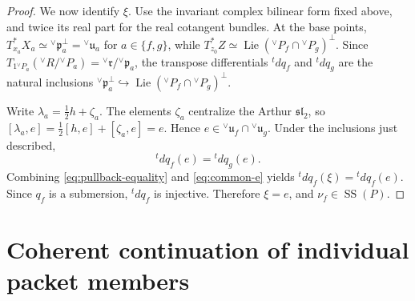 \documentclass[10pt]{amsart}
\numberwithin{equation}{section}
\theoremstyle{plain}
\theoremstyle{definition}
\theoremstyle{remark}
\DeclareMathOperator{\Lie}{Lie}
\newcommand{\fr}{\mathfrak r}
\newcommand{\fp}{\mathfrak p}
\newcommand{\fu}{\mathfrak u}
\newcommand{\vR}{{}^{\vee}R}
\newcommand{\vP}{{}^{\vee}P}
\newcommand{\vfr}{{}^{\vee}\fr}
\newcommand{\vfp}{{}^{\vee}\fp}
\newcommand{\vfu}{{}^{\vee}\fu}
\newcommand{\SSupp}{\operatorname{SS}}
\begin{document}
\begin{proof}
We now identify $\xi$. Use the invariant complex bilinear form fixed above,
and twice its real part for the real cotangent bundles. At the base points,
$T^*_{x_a}X_a\simeq\vfp_a^{\perp}=\vfu_a$ for $a\in\{f,g\}$, while
$T^*_{z_0}Z\simeq\Lie(\vP_f\cap\vP_g)^{\perp}$.
Since $T_{1\vP_a}(\vR/\vP_a)=\vfr/\vfp_a$, the transpose differentials
${}^tdq_f$ and ${}^tdq_g$ are the natural inclusions
$\vfp_a^\perp\hookrightarrow
\Lie(\vP_f\cap\vP_g)^\perp$.

Write $\lambda_a=\tfrac12h+\zeta_a$. The elements $\zeta_a$
centralize the
Arthur $\mathfrak{sl}_2$, so
$[\lambda_a,e]=\tfrac12[h,e]+[\zeta_a,e]=e$.
Hence $e\in\vfu_f\cap\vfu_g$. Under the inclusions just described,
\begin{equation}\label{eq:common-e}
  {}^tdq_f(e)
  ={}^tdq_g(e).
\end{equation}
Combining \eqref{eq:pullback-equality} and \eqref{eq:common-e} yields
${}^tdq_f(\xi)={}^tdq_f(e)$.
Since $q_f$ is a submersion, ${}^tdq_f$ is injective. Therefore $\xi=e$,
and $\nu_f\in\SSupp(P)$.
\end{proof}

\section{Coherent continuation of individual packet members}
\end{document}
